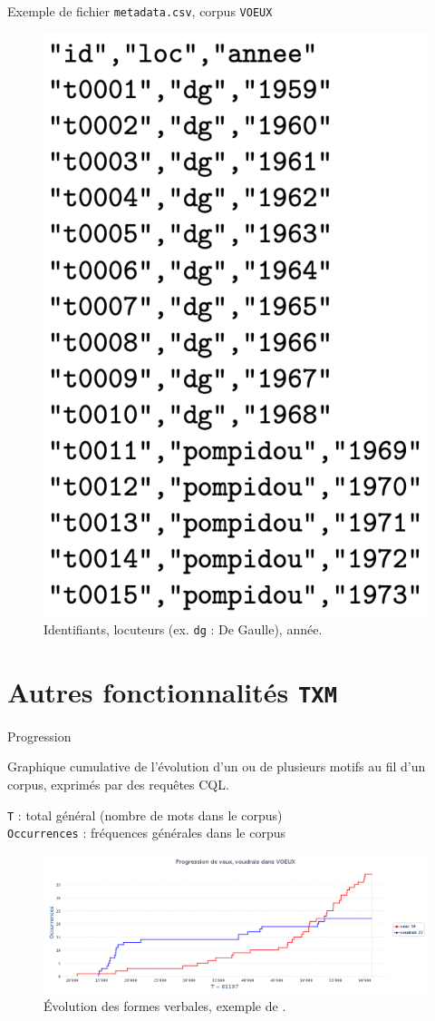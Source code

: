 \documentclass[xetex,xcolor={table,usenames,dvipsnames}]{beamer}
\begin{document}
\begin{frame}{Exemple de fichier \texttt{metadata.csv}, corpus \texttt{VOEUX}}
		\begin{figure}[h] %
		\centering
		\includegraphics[width=.4\linewidth]{img/metadata_csv.png}
		\caption{Identifiants, locuteurs (ex. \texttt{dg} : De Gaulle), année.}
		\label{fig:ling_out_TAL}
	\end{figure}
\end{frame}
\section{Autres fonctionnalités \texttt{TXM}}

\begin{frame}{Progression}
		\begin{block}{\vspace{-6mm}}
		\justifying
 Graphique cumulative de l'évolution d'un ou de plusieurs motifs au fil d'un corpus, exprimés par des requêtes \textsc{CQL}.
 \end{block}
 
{\small \texttt{T} : total général (nombre de mots dans le corpus)\\ \texttt{Occurrences} : fréquences générales dans le corpus}

	\begin{figure}[h] %
		\centering
		\includegraphics[width=.9\linewidth]{img/progression.png}
		\caption{Évolution des formes verbales, exemple de \textcite{lejeune2023}.}
		\label{fig:ling_out_TAL}
	\end{figure}
\end{frame}
\end{document}
